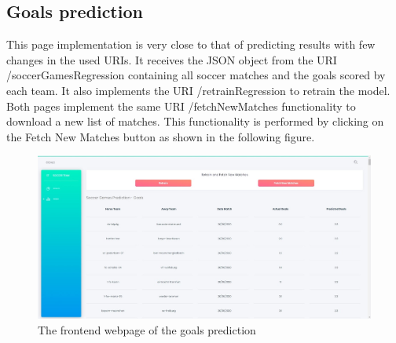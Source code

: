 \subsection{Goals prediction}
This page implementation is very close to that of predicting results with few changes in the used URIs.
It receives the JSON object from the URI /soccerGamesRegression containing all soccer matches and the goals scored by each team.
It also implements the URI /retrainRegression to retrain the model. 
Both pages implement the same URI /fetchNewMatches functionality to download a new list of matches.
This functionality is performed by clicking on the Fetch New Matches button as shown in the following figure. 


\begin{figure}[H]
    \centering
    \includegraphics[width=1\textwidth]{images/frontend_goals_prediction.jpg}
    \caption{The frontend webpage of the goals prediction}
    \label{fig:goals_frontend}
    \end{figure}
